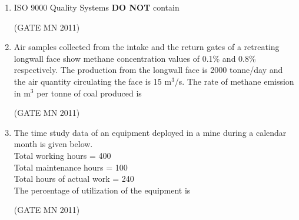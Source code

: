 \documentclass[journal]{IEEEtran}
\begin{document}
\begin{enumerate}
\item ISO 9000 Quality Systems \textbf{DO NOT} contain

	\hfill(GATE MN 2011)
\begin{enumerate}
\end{enumerate}

\item Air samples collected from the intake and the return gates of a retreating longwall face show methane concentration values of 0.1\% and 0.8\% respectively. The production from the longwall face is 2000 tonne/day and the air quantity circulating the face is 15 m$^3$/s. The rate of methane emission in m$^3$ per tonne of coal produced is

	\hfill(GATE MN 2011)
\begin{enumerate}
\end{enumerate}

\item The time study data of an equipment deployed in a mine during a calendar month is given below.\\
Total working hours = 400\\
Total maintenance hours = 100\\
Total hours of actual work = 240\\
The percentage of utilization of the equipment is

\hfill(GATE MN 2011)
\begin{enumerate}
\end{enumerate}


\end{enumerate}
\end{document}
